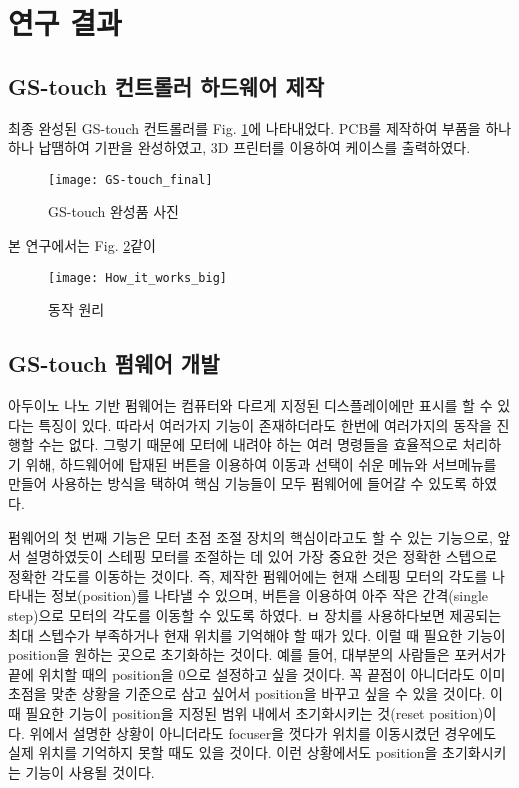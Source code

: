 \section{연구 결과}

\subsection{GS-touch 컨트롤러 하드웨어 제작}

최종 완성된 GS-touch 컨트롤러를 Fig. \ref{fig:final_product}에 나타내었다. PCB를 제작하여 부품을 하나하나 납땜하여 기판을 완성하였고, 3D 프린터를 이용하여 케이스를 출력하였다.

\begin{figure}[h]
	\begin{center}
		\texttt{[image: GS-touch\_final]}
		\caption{GS-touch 완성품 사진}
		\label{fig:final_product}
	\end{center}
\end{figure}


본 연구에서는 Fig. \ref{fig:How_it_works_big}\과 같이 

\begin{figure}[h]
	\begin{center}
		\texttt{[image: How\_it\_works\_big]}
		\caption{동작 원리}
		\label{fig:How_it_works_big}
	\end{center}
\end{figure}

\subsection{GS-touch 펌웨어 개발}

아두이노 나노 기반 펌웨어는 컴퓨터와 다르게 지정된 디스플레이에만 표시를 할 수 있다는 특징이 있다. 따라서 여러가지 기능이 존재하더라도 한번에 여러가지의 동작을 진행할 수는 없다. 그렇기 때문에 모터에 내려야 하는 여러 명령들을 효율적으로 처리하기 위해, 하드웨어에 탑재된 버튼을 이용하여 이동과 선택이 쉬운 메뉴와 서브메뉴를 만들어 사용하는 방식을 택하여 핵심 기능들이 모두 펌웨어에 들어갈 수 있도록 하였다.

펌웨어의 첫 번째 기능은 모터 초점 조절 장치의 핵심이라고도 할 수 있는 기능으로, 앞서 설명하였듯이 스테핑 모터를 조절하는 데 있어 가장 중요한 것은 정확한 스텝으로 정확한 각도를 이동하는 것이다. 즉, 제작한 펌웨어에는 현재 스테핑 모터의 각도를 나타내는 정보(position)를 나타낼 수 있으며, 버튼을 이용하여 아주 작은 간격(single step)으로 모터의 각도를 이동할 수 있도록 하였다.
ㅂ
장치를 사용하다보면 제공되는 최대 스텝수가 부족하거나 현재 위치를 기억해야 할 때가 있다. 이럴 때 필요한 기능이 position을 원하는 곳으로 초기화하는 것이다. 예를 들어, 대부분의 사람들은 포커서가 끝에 위치할 때의 position을 0으로 설정하고 싶을 것이다. 꼭 끝점이 아니더라도 이미 초점을 맞춘 상황을 기준으로 삼고 싶어서 position을 바꾸고 싶을 수 있을 것이다. 이 때 필요한 기능이 position을 지정된 범위 내에서 초기화시키는 것(reset position)이다. 위에서 설명한 상황이 아니더라도 focuser을 껏다가 위치를 이동시켰던 경우에도 실제 위치를 기억하지 못할 때도 있을 것이다. 이런 상황에서도 position을 초기화시키는 기능이 사용될 것이다.


